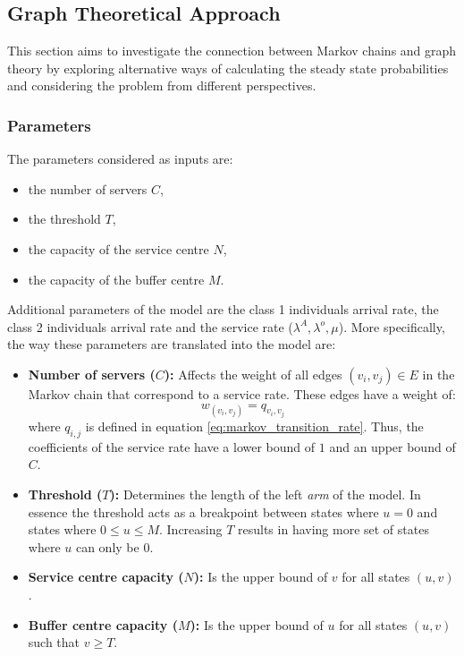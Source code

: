 \subsection{Graph Theoretical Approach}

This section aims to investigate the connection between Markov chains and graph 
theory by exploring alternative ways of calculating the steady state probabilities 
and considering the problem from different perspectives.

\subsubsection{Parameters}
The parameters considered as inputs are:
\begin{multicols}{2}
    \begin{itemize}
        \item the number of servers \(C\),
        \item the threshold \(T\), 
        \item the capacity of the service centre \(N\),
        \item the capacity of the buffer centre \(M\). 
    \end{itemize}
\end{multicols}

Additional parameters of the model are the class 1 individuals arrival rate, 
the class 2 individuals
arrival rate and the service rate (\(\lambda^A, \lambda^o, \mu\)). 
More specifically, the way these parameters are translated into the model are:

\begin{itemize}
    \item \textbf{Number of servers (\(C\)):} Affects the weight of all edges 
    \((v_i, v_j) \in E\) in the Markov chain that correspond to a service rate. 
    These edges have a weight of: 
    \begin{equation*}
        w_{(v_i, v_j)} = q_{v_i, v_j}
    \end{equation*}
    where \(q_{i,j}\) is defined in equation \ref{eq:markov_transition_rate}.
    Thus, the coefficients of the service rate have a lower bound of \(1\) and 
    an upper bound of \(C\).
    \item \textbf{Threshold (\(T\)):} Determines the length of the left 
    \textit{arm} of the model. 
    In essence the threshold acts as a breakpoint between states where \(u=0\) 
    and states where \(0 \leq u \leq M\). 
    Increasing \(T\) results in having more set of states where \(u\) can only 
    be \(0\).
    \item \textbf{Service centre capacity (\(N\)):} Is the upper bound of \(v\) for all 
    states \((u,v)\).
    \item \textbf{Buffer centre capacity (\(M\)):} Is the upper bound of \(u\) for all 
    states \((u,v)\) such that \(v \geq T\).
\end{itemize}


